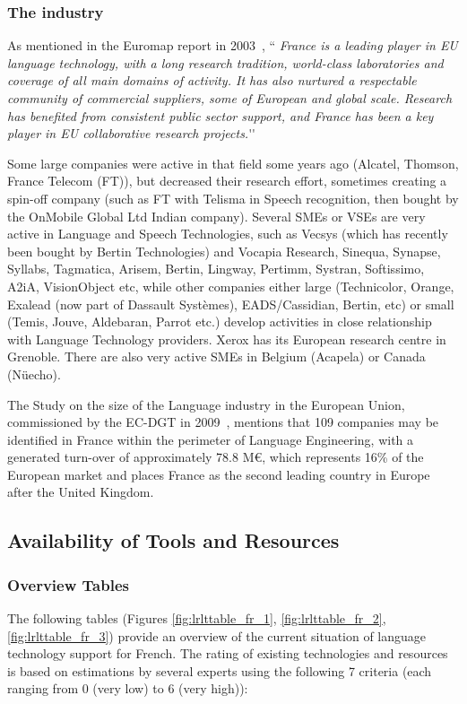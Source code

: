 \begin{multicols}{2}
\subsubsection{The industry}

As mentioned in the Euromap report in 2003~\cite{euromap}, ``{\em
  France is a leading player in EU language technology, with a long
  research tradition, world-class laboratories and coverage of all
  main domains of activity. It has also nurtured a respectable
  community of commercial suppliers, some of European and global
  scale. Research has benefited from consistent public sector support,
  and France has been a key player in EU collaborative research
  projects.}{\mbox '}{\mbox '}

Some large companies were active in that field some years ago
(Alcatel, Thomson, France Telecom (FT)), but decreased their research
effort, sometimes creating a spin-off company (such as FT with Telisma
in Speech recognition, then bought by the OnMobile Global Ltd Indian
company). Several SMEs or VSEs are very active in Language and Speech
Technologies, such as Vecsys (which has recently been bought by Bertin
Technologies) and Vocapia Research, Sinequa, Synapse, Syllabs,
Tagmatica, Arisem, Bertin, Lingway, Pertimm, Systran, Softissimo,
A2iA, VisionObject etc, while other companies either large
(Technicolor, Orange, Exalead (now part of Dassault Systèmes),
EADS/Cassidian, Bertin, etc) or small (Temis, Jouve, Aldebaran, Parrot
etc.) develop activities in close relationship with Language
Technology providers. Xerox has its European research centre in
Grenoble. There are also very active SMEs in Belgium (Acapela) or
Canada (Nüecho).

The Study on the size of the Language industry in the European Union,
commissioned by the EC-DGT in 2009~\cite{DGT09}, mentions that 109 companies may
be identified in France within the perimeter of Language Engineering,
with a generated turn-over of approximately 78.8 M€, which represents
16\% of the European market and places France as the second leading
country in Europe after the United Kingdom.

\subsection{Availability of Tools and Resources}

\subsubsection{Overview Tables}
The following tables (Figures \ref{fig:lrlttable_fr_1}, \ref{fig:lrlttable_fr_2}, \ref{fig:lrlttable_fr_3}) provide an overview of the current situation of
language technology support for French. The rating of existing
technologies and resources is based on estimations by several experts
using the following 7 criteria (each ranging from 0 (very low) to 6
(very high)):


\end{multicols}
